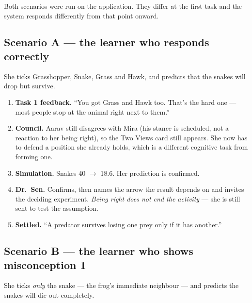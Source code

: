 \documentclass[11pt,a4paper]{article}
\begin{document}
Both scenarios were run on the application. They differ at the first task and the system
responds differently from that point onward.

\subsection*{Scenario A --- the learner who responds correctly}

She ticks Grasshopper, Snake, Grass and Hawk, and predicts that the snakes will drop but survive.

\begin{enumerate}[leftmargin=*,itemsep=1pt]
  \item \textbf{Task 1 feedback.} ``You got Grass and Hawk too. That's the hard one --- most
        people stop at the animal right next to them.''
  \item \textbf{Council.} Aarav still disagrees with Mira (his stance is scheduled, not a
        reaction to her being right), so the Two Views card still appears. She now has to defend
        a position she already holds, which is a different cognitive task from forming one.
  \item \textbf{Simulation.} Snakes 40 $\rightarrow$ 18.6. Her prediction is confirmed.
  \item \textbf{Dr.\ Sen.} Confirms, then names the arrow the result depends on and invites the
        deciding experiment. \emph{Being right does not end the activity} --- she is still sent
        to test the assumption.
  \item \textbf{Settled.} ``A predator survives losing one prey only if it has another.''
\end{enumerate}

\subsection*{Scenario B --- the learner who shows misconception 1}

She ticks \emph{only} the snake --- the frog's immediate neighbour --- and predicts the snakes
will die out completely.
\end{document}
